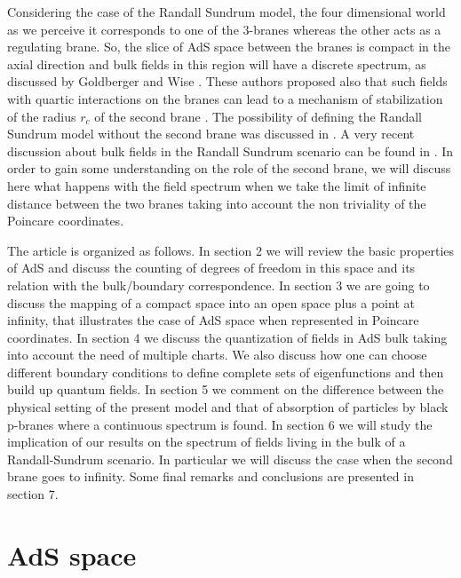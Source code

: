 \documentclass[a4paper,12pt]{article}
\begin{document}
Considering the case of the Randall Sundrum model, the four
dimensional world as we perceive it  corresponds 
to one of the  3-branes whereas the other  acts as a regulating brane. 
So, the slice of AdS space between the branes is compact in the axial 
direction and  bulk fields in this region will have a discrete spectrum,
as discussed by Goldberger and Wise \cite{GW1}. 
These authors  proposed also that such fields with quartic interactions on 
the branes can lead to a mechanism of stabilization of the radius 
$r_c$ of the second brane \cite{GW2}.
The possibility of defining the Randall Sundrum model without
the second brane was discussed in \cite{DK}.
A very recent discussion about bulk fields in the Randall Sundrum scenario
can be found in \cite{Ran}.
In order to gain some understanding on the role of the second brane,
we will discuss here what happens with the field spectrum when we 
take the limit of infinite distance between the two branes taking 
into account the non triviality of the Poincare coordinates.


The article is organized as follows. In section 2 we will review the 
basic properties of AdS and discuss the counting of degrees of freedom
in this space and its relation with the bulk/boundary correspondence.
In section 3 we are going to discuss the mapping of a
compact space into an open space plus a point at infinity, that illustrates
the case of AdS space when represented in Poincare coordinates.  
In section 4 we discuss the quantization of fields in AdS bulk taking
into account the need of multiple charts.
We also discuss how one can choose different boundary conditions
to define complete sets of eigenfunctions and then build up quantum fields.
In section 5 we comment on the difference between the physical setting
of the present model and that of absorption of particles by black p-branes
where a continuous spectrum is found.
In section 6 we will study the implication of our results on the  
spectrum of fields living in the bulk of a Randall-Sundrum
scenario. In particular we will discuss the case when the second brane 
goes to infinity. Some final remarks and conclusions are presented 
in section 7.



\bigskip

\section{AdS space}
\end{document}
